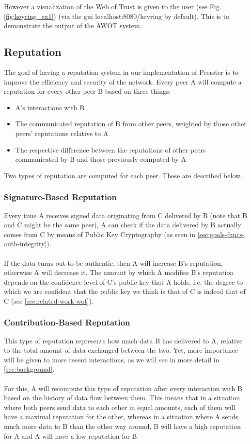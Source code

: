 \documentclass[]{article}
\begin{document}
However a visualization of the Web of Trust is given to the user (see Fig. \ref{fig:keyring_ex1}) (via the gui localhost:8080/keyring by default). This is to demonstrate the output of the AWOT system.

\subsection{Reputation}
\label{sec:goals-funcs-rep}
The goal of having a reputation system in our implementation of Peerster is to improve the efficiency and security of the network.
Every peer A will compute a reputation for every other peer B based on three things:

\begin{itemize}
\item A's interactions with B
\item The communicated reputation of B from other peers, weighted by those other peers' reputations relative to A
\item The respective difference between the reputations of other peers communicated by B and those previously computed by A
\end{itemize}

Two types of reputation are computed for each peer. These are described below.

\subsubsection{Signature-Based Reputation}
\label{sec:sig-based-rep}
Every time A receives signed data originating from C delivered by B (note that B and C might be the same peer), A can check if the data delivered by B actually comes from C by means of Public Key Cryptography (as seen in \ref{sec:goals-funcs-auth-integrity}).
\\\\
If the data turns out to be authentic, then A will increase B's reputation, otherwise A will decrease it.
The amount by which A modifies B's reputation depends on the confidence level of C's public key that A holds, i.e. the degree to which we are confident that the public key we think is that of C is indeed that of C (see \ref{sec:related-work-wot}).

\subsubsection{Contribution-Based Reputation}
This type of reputation represents how much data B has delivered to A, relative to the total amount of data exchanged between the two.
Yet, more importance will be given to more recent interactions, as we will see in more detail in \ref{sec:background}.
\\\\
For this, A will recompute this type of reputation after every interaction with B based on the history of data flow between them.
This means that in a situation where both peers send data to each other in equal amounts, each of them will have a maximal reputation for the other, whereas in a situation where A sends much more data to B than the other way around, B will have a high reputation for A and A will have a low reputation for B.
\end{document}
